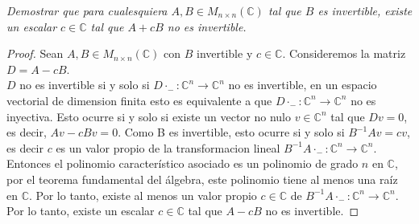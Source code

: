 \documentclass[11pt]{article}
\newcommand{\C}{\mathbb{C}}
\begin{document}
\begin{tcolorbox}[title = \textcolor{black}{\textcolor{white}{Problema 4}}]
\textit{
Demostrar que para cualesquiera \( A, B \in M_{n \times n}(\mathbb{C}) \) tal que \( B \) es invertible, existe un escalar \( c \in \mathbb{C} \) tal que \( A + cB \) no es invertible.
}
\end{tcolorbox}
\begin{proof}
    Sean \( A, B \in M_{n \times n}(\C) \) con \( B \) invertible y \( c \in \C \). Consideremos la matriz \( D = A - cB \).\\[10pt] 
    \( D\) no es invertible si y solo si \( D\cdot _{-}:\C^n\rightarrow \C^n\) no es invertible, en un espacio vectorial de dimension 
    finita esto es equivalente a que \( D\cdot _{-}:\C^n\rightarrow \C^n\) no es inyectiva. Esto ocurre si y solo si existe un vector no nulo \( v \in \C^n \) tal que \( Dv = 0 \), es decir, 
    \( Av-cBv = 0 \). Como B es invertible, esto ocurre si y solo si \( B^{-1}Av=cv\), es decir \( c \) es un valor propio de la transformacion lineal \( B^{-1}A\cdot _{-}:\C^n\rightarrow \C^n\).\\[10pt]
    Entonces el polinomio característico asociado es un polinomio de grado \( n \) en \( \C \), por el teorema fundamental del álgebra, este polinomio tiene al menos una raíz en \( \C \).
    Por lo tanto, existe al menos un valor propio \( c \in \C \) de \( B^{-1}A\cdot _{-}:\C^n\rightarrow \C^n\). Por lo tanto, existe un escalar \( c \in \C \) tal que \( A - cB \) no es invertible.
\end{proof}\,\\
\end{document}
